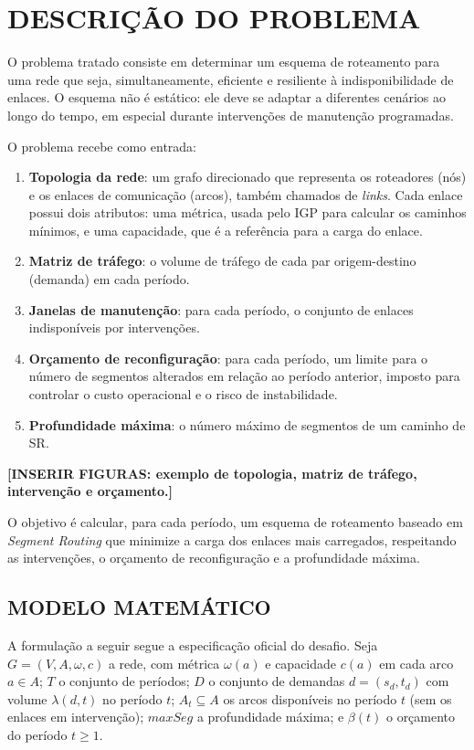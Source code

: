 \chapter{DESCRIÇÃO DO PROBLEMA}
\label{cap:problema}

O problema tratado consiste em determinar um esquema de roteamento para uma rede que seja, simultaneamente, eficiente e resiliente à indisponibilidade de enlaces. O esquema não é estático: ele deve se adaptar a diferentes cenários ao longo do tempo, em especial durante intervenções de manutenção programadas.

O problema recebe como entrada:

\begin{enumerate}
    \item \textbf{Topologia da rede}: um grafo direcionado que representa os roteadores (nós) e os enlaces de comunicação (arcos), também chamados de \textit{links}. Cada enlace possui dois atributos: uma métrica, usada pelo IGP para calcular os caminhos mínimos, e uma capacidade, que é a referência para a carga do enlace.
    \item \textbf{Matriz de tráfego}: o volume de tráfego de cada par origem-destino (demanda) em cada período.
    \item \textbf{Janelas de manutenção}: para cada período, o conjunto de enlaces indisponíveis por intervenções.
    \item \textbf{Orçamento de reconfiguração}: para cada período, um limite para o número de segmentos alterados em relação ao período anterior, imposto para controlar o custo operacional e o risco de instabilidade.
    \item \textbf{Profundidade máxima}: o número máximo de segmentos de um caminho de SR.
\end{enumerate}

\textbf{[INSERIR FIGURAS: exemplo de topologia, matriz de tráfego, intervenção e orçamento.]}

O objetivo é calcular, para cada período, um esquema de roteamento baseado em \textit{Segment Routing} que minimize a carga dos enlaces mais carregados, respeitando as intervenções, o orçamento de reconfiguração e a profundidade máxima.

\section{\uppercase{Modelo Matemático}}

A formulação a seguir segue a especificação oficial do desafio. Seja $G = (V, A, \omega, c)$ a rede, com métrica $\omega(a)$ e capacidade $c(a)$ em cada arco $a \in A$; $T$ o conjunto de períodos; $D$ o conjunto de demandas $d = (s_d, t_d)$ com volume $\lambda(d, t)$ no período $t$; $A_t \subseteq A$ os arcos disponíveis no período $t$ (sem os enlaces em intervenção); $\mathit{maxSeg}$ a profundidade máxima; e $\beta(t)$ o orçamento do período $t \geq 1$.

